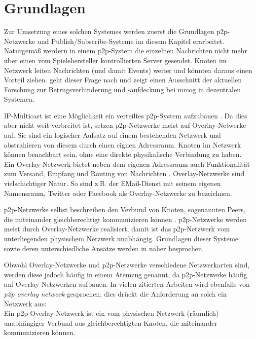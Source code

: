 \chapter{Grundlagen}
\label{chap:grundlagen}



Zur Umsetzung eines solchen Systemes werden zuerst die Grundlagen \ac{p2p}-Netzwerke und Publish/Subscribe-Systeme im diesem Kapitel erarbeitet. Naturgemäß werdern in einem \ac{p2p}-System die einzelnen Nachrichten nicht mehr über einen vom Spielehersteller kontrollierten Server gesendet. Knoten im Netzwerk leiten Nachrichten (und damit Events) weiter und könnten daraus einen Vorteil ziehen.  geht dieser Frage nach und zeigt einen Ausschnitt der aktuellen Forschung zur Betrugsverhinderung und -aufdeckung bei \ac{mmog} in dezentralen Systemen.

IP-Multicast ist eine Möglichkeit ein verteiltes \ac{p2p}-System aufzubauen \cite{Deering1990Multicast}. Da dies aber nicht weit verbreitet ist, setzen \ac{p2p}-Netzwerke meist auf Overlay-Netwerke auf. Sie sind ein logischer Aufsatz auf einem bestehenden Netzwerk und abstrahieren von diesem durch einen eignen Adressraum. Knoten im Netzwerk können benachbart sein, ohne eine direkte physikalische Verbindung zu haben. Ein Overlay-Netzwerk bietet neben dem eigenen Adressraum auch Funktionalität zum Versand, Empfang und Routing von Nachrichten \cite{Tannenbaum2003}. Overlay-Netzwerke sind vielschichtiger Natur. So sind z.B. der EMail-Dienst mit seinem eigenen Namensraum, Twitter oder Facebook als Overlay-Netzwerke zu bezeichnen.

p2p-Netzwerke selbst beschreiben den Verbund von Knoten, sogenannten Peers, die miteinander gleichberechtigt kommunizieren können \cite{Steinmetz2005}. p2p-Netzwerke werden meist durch Overlay-Netzwerke realisiert, damit ist das p2p-Netzwerk vom unterliegenden physischem Netzwerk unabhängig. Grundlagen dieser Systeme sowie deren unterschiedliche Ansätze werden in  näher besprochen.

Obwohl Overlay-Netzwerke und \ac{p2p}-Netzwerke verschiedene Netzwerkarten sind, werden diese jedoch häufig in einem Atemzug genannt, da p2p-Netzwerke häufig auf Overlay-Netzwerken aufbauen. In vielen zitierten Arbeiten wird ebenfalls von \emph{p2p overlay network} gesprochen; dies drückt die Anforderung an solch ein Netzwerk aus:\\
Ein p2p Overlay-Netzwerk ist ein vom physischen Netzwerk (räumlich) unabhängiger Verbund aus gleichberechtigten Knoten, die miteinander kommunizieren können.











